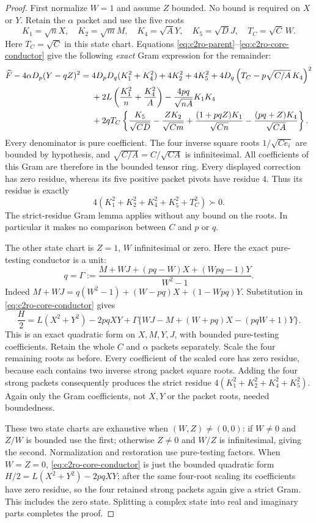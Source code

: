 \begin{proof}
First normalize $W=1$ and assume $Z$ bounded.  No bound is required
on $X$ or $Y$.  Retain the $\alpha$ packet and use the five roots
\[
 K_1=\sqrt nX,\quad K_2=\sqrt mM,\quad
 K_4=\sqrt AY,\quad K_5=\sqrt DJ,\quad T_C=\sqrt C\,W.
\]
Here $T_C=\sqrt C$ in this state chart.  Equations
\eqref{eq:c2ro-parent}--\eqref{eq:c2ro-core-conductor} give the following
\emph{exact} Gram expression for the remainder:
\begin{align}
\widehat F-4\alpha D_p(Y-qZ)^2={}&
 4D_pD_q(K_1^2+K_4^2)+4K_2^2+4K_5^2
 +4D_q\left(T_C-p\sqrt{C/A}\,K_4\right)^2\notag\\
&+2L\left(\frac{K_1^2}{n}+\frac{K_4^2}{A}\right)
 -\frac{4pq}{\sqrt{nA}}K_1K_4\notag\\
&+2qT_C\left\{
 \frac{K_5}{\sqrt{CD}}-\frac{ZK_2}{\sqrt{Cm}}
 +\frac{(1+pqZ)K_1}{\sqrt{Cn}}
 -\frac{(pq+Z)K_4}{\sqrt{CA}}\right\}.
\label{eq:c2ro-Wunit-Gram}
\end{align}
Every denominator is pure coefficient.  The four inverse square roots
$1/\sqrt{Ce_i}$ are bounded by hypothesis, and
$\sqrt{C/A}=C/\sqrt{CA}$ is infinitesimal.
All coefficients of this Gram are therefore in the bounded tensor
ring.  Every displayed correction has zero residue, whereas its five
positive packet pivots have residue $4$.  Thus its residue is exactly
\[
             4(K_1^2+K_2^2+K_4^2+K_5^2+T_C^2)\succ0.
\]
The strict-residue Gram lemma applies without any bound on the roots.
In particular it makes no comparison between $C$ and $p$ or $q$.

The other state chart is $Z=1$, $W$ infinitesimal or zero.  Here the
exact pure-testing conductor is a unit:
\begin{equation}
 q=\Gamma:=\frac{M+WJ+(pq-W)X+(Wpq-1)Y}{W^2-1}.
\label{eq:c2ro-Zunit-conductor}
\end{equation}
Indeed $M+WJ=q(W^2-1)+(W-pq)X+(1-Wpq)Y$.
Substitution in \eqref{eq:c2ro-core-conductor} gives
\begin{equation}
 \frac H2=L(X^2+Y^2)-2pqXY
 +\Gamma\{WJ-M+(W+pq)X-(pqW+1)Y\}.
\label{eq:c2ro-Zunit-core}
\end{equation}
This is an exact quadratic form on $X,M,Y,J$, with bounded pure-testing
coefficients.  Retain the whole $C$ and $\alpha$ packets separately.
Scale the four remaining roots as before.  Every coefficient of the
scaled core has zero residue, because each contains two inverse strong
packet square roots.  Adding the four strong packets consequently
produces the strict residue
$4(K_1^2+K_2^2+K_4^2+K_5^2)$.  Again only the Gram coefficients,
not $X,Y$ or the packet roots, needed boundedness.

These two state charts are exhaustive when $(W,Z)\ne(0,0)$: if
$W\ne0$ and $Z/W$ is bounded use the first; otherwise $Z\ne0$ and
$W/Z$ is infinitesimal, giving the second.  Normalization and restoration
use pure-testing factors.  When $W=Z=0$,
\eqref{eq:c2ro-core-conductor} is just the bounded quadratic form
$H/2=L(X^2+Y^2)-2pqXY$; after the same four-root scaling its
coefficients have zero residue, so the four retained strong packets
again give a strict Gram.  This includes the zero state.  Splitting a
complex state into real and imaginary parts completes the proof.
\end{proof}

